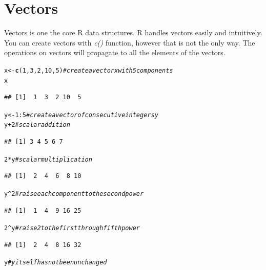 \documentclass[english,nohyper]{tufte-book}\usepackage[]{graphicx}\usepackage[]{color}
\makeatletter
\newcommand{\hlnum}[1]{\textcolor[rgb]{0.686,0.059,0.569}{#1}}%
\newcommand{\hlcom}[1]{\textcolor[rgb]{0.678,0.584,0.686}{\textit{#1}}}%
\newcommand{\hlopt}[1]{\textcolor[rgb]{0,0,0}{#1}}%
\newcommand{\hlstd}[1]{\textcolor[rgb]{0.345,0.345,0.345}{#1}}%
\newcommand{\hlkwb}[1]{\textcolor[rgb]{0.69,0.353,0.396}{#1}}%
\newcommand{\hlkwd}[1]{\textcolor[rgb]{0.737,0.353,0.396}{\textbf{#1}}}%
\newenvironment{kframe}{%
 \def\at@end@of@kframe{}%
 \ifinner\ifhmode%
  \def\at@end@of@kframe{\end{minipage}}%
  \begin{minipage}{\columnwidth}%
 \fi\fi%
 \def\FrameCommand##1{\hskip\@totalleftmargin \hskip-\fboxsep
 \colorbox{shadecolor}{##1}\hskip-\fboxsep
     \hskip-\linewidth \hskip-\@totalleftmargin \hskip\columnwidth}%
 \MakeFramed {\advance\hsize-\width
   \@totalleftmargin\z@ \linewidth\hsize
   \@setminipage}}%
 {\par\unskip\endMakeFramed%
 \at@end@of@kframe}
\newenvironment{knitrout}{}{} %
\makeatother
\begin{document}
\section{Vectors}

Vectors is one the core R data structures. R handles vectors easily
and intuitively. You can create vectors with \emph{c()} function,
however that is not the only way. The operations on vectors will propagate
to all the elements of the vectors.

\begin{knitrout}
\color{fgcolor}\begin{kframe}
\begin{alltt}
\hlstd{x} \hlkwb{<-} \hlkwd{c}\hlstd{(}\hlnum{1}\hlstd{,} \hlnum{3}\hlstd{,} \hlnum{2}\hlstd{,} \hlnum{10}\hlstd{,} \hlnum{5}\hlstd{)}  \hlcom{#create a vector x with 5 components }
\hlstd{x}
\end{alltt}
\begin{verbatim}
## [1]  1  3  2 10  5
\end{verbatim}
\begin{alltt}
\hlstd{y} \hlkwb{<-} \hlnum{1}\hlopt{:}\hlnum{5}  \hlcom{#create a vector of consecutive integers y }
\hlstd{y} \hlopt{+} \hlnum{2}  \hlcom{#scalar addition }
\end{alltt}
\begin{verbatim}
## [1] 3 4 5 6 7
\end{verbatim}
\begin{alltt}
\hlnum{2} \hlopt{*} \hlstd{y}  \hlcom{#scalar multiplication}
\end{alltt}
\begin{verbatim}
## [1]  2  4  6  8 10
\end{verbatim}
\begin{alltt}
\hlstd{y}\hlopt{^}\hlnum{2}  \hlcom{#raise each component to the second power}
\end{alltt}
\begin{verbatim}
## [1]  1  4  9 16 25
\end{verbatim}
\begin{alltt}
\hlnum{2}\hlopt{^}\hlstd{y}  \hlcom{#raise 2 to the first through fifth power }
\end{alltt}
\begin{verbatim}
## [1]  2  4  8 16 32
\end{verbatim}
\begin{alltt}
\hlstd{y}  \hlcom{#y itself has not been unchanged }
\end{alltt}

\end{kframe}
\end{knitrout}
\end{document}
